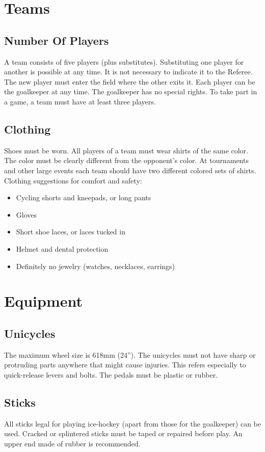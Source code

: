 \section{Teams}

\subsection{Number Of Players}
A team consists of five players (plus substitutes). Substituting one player for another is possible at any time. It is not
necessary to indicate it to the Referee. The new player must enter the field where the other exits it. Each player can be
the goalkeeper at any time. The goalkeeper has no special rights. To take part in a game, a team must have at least three
players.

\subsection{Clothing}
Shoes must be worn. All players of a team must wear shirts of the same color. The color must be clearly different from
the opponent’s color. At tournaments and other large events each team should have two different colored sets of shirts.\\
Clothing suggestions for comfort and safety:\\
\begin{itemize}
\item Cycling shorts and kneepads, or long pants
\item Gloves
\item Short shoe laces, or laces tucked in
\item Helmet and dental protection
\item Definitely no jewelry (watches, necklaces, earrings)
\end{itemize}

\section{Equipment}

\subsection{Unicycles}
The maximum wheel size is 618mm (24”). The unicycles must not have sharp or protruding parts anywhere that might
cause injuries. This refers especially to quick-release levers and bolts. The pedals must be plastic or rubber.

\subsection{Sticks}
All sticks legal for playing ice-hockey (apart from those for the goalkeeper) can be used. Cracked or splintered sticks
must be taped or repaired before play. An upper end made of rubber is recommended.

